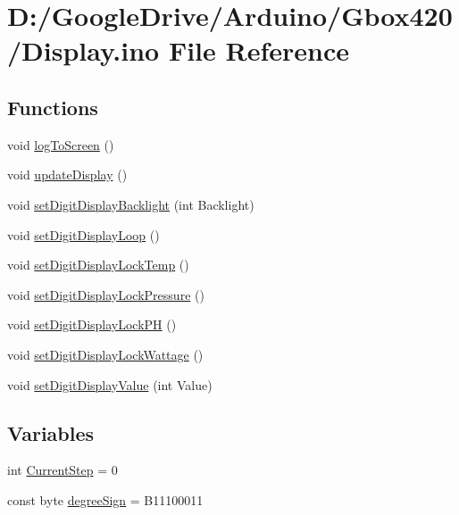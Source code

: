 \hypertarget{_display_8ino}{}\section{D\+:/\+Google\+Drive/\+Arduino/\+Gbox420/\+Display.ino File Reference}
\label{_display_8ino}
\subsection*{Functions}
\begin{DoxyCompactItemize}
\item 
void \mbox{\hyperlink{_display_8ino_a334d5caa6919daf0965dc3946375ec8c}{log\+To\+Screen}} ()
\item 
void \mbox{\hyperlink{_display_8ino_ab7eb3c8c2e8604801ee00f11d3af8c3f}{update\+Display}} ()
\item 
void \mbox{\hyperlink{_display_8ino_a43bbc37f43ddbbd0173c852bdf884535}{set\+Digit\+Display\+Backlight}} (int Backlight)
\item 
void \mbox{\hyperlink{_display_8ino_a3ae520b9d52111849eda60c42617230f}{set\+Digit\+Display\+Loop}} ()
\item 
void \mbox{\hyperlink{_display_8ino_a541697a8dce5fe9daf612f8ee30f5390}{set\+Digit\+Display\+Lock\+Temp}} ()
\item 
void \mbox{\hyperlink{_display_8ino_af8ac9a38946b4bc55424b64259d268af}{set\+Digit\+Display\+Lock\+Pressure}} ()
\item 
void \mbox{\hyperlink{_display_8ino_a473c95caf3385fd3e2de85ae367d222d}{set\+Digit\+Display\+Lock\+PH}} ()
\item 
void \mbox{\hyperlink{_display_8ino_a0622ff51a9ee6be2b6a1e4f2eddaee38}{set\+Digit\+Display\+Lock\+Wattage}} ()
\item 
void \mbox{\hyperlink{_display_8ino_a8645226b3b065f505ca518b8ebdded8e}{set\+Digit\+Display\+Value}} (int Value)
\end{DoxyCompactItemize}
\subsection*{Variables}
\begin{DoxyCompactItemize}
\item 
int \mbox{\hyperlink{_display_8ino_abed21f2cc15579508af7dd150962b897}{Current\+Step}} = 0
\item 
const byte \mbox{\hyperlink{_display_8ino_a52bbda9914dc743d68aa085b872e9627}{degree\+Sign}} = B11100011
\end{DoxyCompactItemize}


